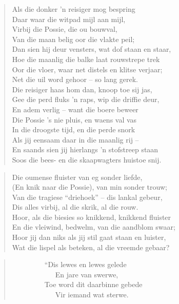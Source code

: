 \begin{verse}
Als die donker ’n reisiger mog bespring \\ 
Daar waar die witpad mijl aan mijl, \\ 
Virbij die Possie, die ou bouwval, \\ 
Van die maan belig oor die vlakte peil; \\ 
Dan sien hij deur vensters, wat dof staan en staar, \\ 
Hoe die maanlig die balke laat rouwstrepe trek \\ 
Oor die vloer, waar net distels en klitse verjaar; \\ 
Net die uil word gehoor -- so lang gerek. \\ 
Die reisiger haas hom dan, knoop toe sij jas, \\ 
Gee die perd fluks ’n raps, wip die driffie deur, \\ 
En adem verlig -- want die boere beweer \\ 
Die Possie ’s nie pluis, en waens val vas \\ 
In die droogste tijd, en die perde snork \\ 
Als jij eensaam daar in die maanlig rij --  \\ 
En saands sien jij hierlangs ’n stofstreep staan \\ 
Soos die bees- en die skaapwagters huistoe snij. \\ 
\end{verse}

\begin{verse}
Die oumense fluister van eg sonder liefde, \\ 
(En knik naar die Possie), van min sonder trouw; \\ 
Van die tragiese ``driehoek'' -- dis lankal gebeur, \\ 
Dis alles virbij, al die skrik, al die rouw. \\ 
Hoor, als die biesies so knikkend, knikkend fluister \\ 
En die vleiwind, bedwelm, van die aandblom swaar; \\ 
Hoor jij dan niks als jij stil gaat staan en luister, \\ 
Wat die lispel als beteken, al die vreemde gebaar? \\ 
\end{verse}

\begin{verse}
\ \ \ \ \ \ \ \ \ ``Dis lewes en lewes gelede \\ 
\ \ \ \ \ \ \ \ \ \ \ \ En jare van swerwe, \\ 
\ \ \ \ \ \ \ \ \ Toe word dit daarbinne gebede \\ 
\ \ \ \ \ \ \ \ \ \ \ \ Vir iemand wat sterwe. \\ 
\end{verse}

